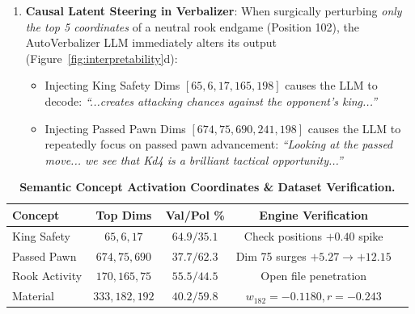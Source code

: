 \documentclass[10pt,twocolumn]{article}
\begin{document}
\begin{enumerate}
\begin{itemize}
        \item \textit{King Check Detector (Dims 65, 6, 17)}: On positions where the king is in check ($\text{board.is\_check()}$), activations on Dims 65, 6, and 17 systematically spike higher by $+0.35$ to $+0.40$ relative to normal castled kings.
        \item \textit{Material Evaluation (Dim 182)}: The top text-extracted material dimension (Dim 182) directly corresponds to a learned engine weight $w_{182} = -0.1180$ in $\text{Linear}(256, 1)$, with a correlation $r = -0.2432$ across 2,501 validation positions.
    \end{itemize}
    \item \textbf{Causal Latent Steering in Verbalizer}: When surgically perturbing \textit{only the top 5 coordinates} of a neutral rook endgame (Position 102), the AutoVerbalizer LLM immediately alters its output (Figure~\ref{fig:interpretability}d):
    \begin{itemize}
        \item Injecting King Safety Dims $[65, 6, 17, 165, 198]$ causes the LLM to decode: \textit{``...creates attacking chances against the opponent's king...''}
        \item Injecting Passed Pawn Dims $[674, 75, 690, 241, 198]$ causes the LLM to repeatedly focus on passed pawn advancement: \textit{``Looking at the passed move... we see that Kd4 is a brilliant tactical opportunity...''}
    \end{itemize}
\end{enumerate}

\begin{table}[h]
\centering
\small
\caption{\textbf{Semantic Concept Activation Coordinates \& Dataset Verification.}}
\label{tab:interpretability}
\begin{tabular}{lcccc}
\toprule
\textbf{Concept} & \textbf{Top Dims} & \textbf{Val/Pol \%} & \textbf{Engine Verification} \\
\midrule
King Safety & $65, 6, 17$ & $64.9 / 35.1$ & Check positions $+0.40$ spike \\
Passed Pawn & $674, 75, 690$ & $37.7 / 62.3$ & Dim 75 surges $+5.27 \to +12.15$ \\
Rook Activity & $170, 165, 75$ & $55.5 / 44.5$ & Open file penetration \\
Material & $333, 182, 192$ & $40.2 / 59.8$ & $w_{182} = -0.1180, r = -0.243$ \\
\bottomrule
\end{tabular}
\end{table}
\end{document}
